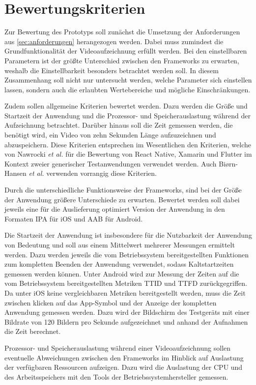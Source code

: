 \section{Bewertungskriterien}

Zur Bewertung des Prototyps soll zunächst die Umsetzung der Anforderungen aus \autoref{sec:anforderungen} herangezogen werden.
Dabei muss zumindest die Grundfunktionalität der Videoaufzeichnung erfüllt werden.
Bei den einstellbaren Parametern ist der größte Unterschied zwischen den Frameworks zu erwarten, weshalb die Einstellbarkeit besonders betrachtet werden soll.
In diesem Zusammenhang soll nicht nur untersucht werden, welche Parameter sich einstellen lassen, sondern auch die erlaubten Wertebereiche und mögliche Einschränkungen.


Zudem sollen allgemeine Kriterien bewertet werden.
Dazu werden die Größe und Startzeit der Anwendung und die Prozessor- und Speicherauslastung während der Aufzeichnung betrachtet.
Darüber hinaus soll die Zeit gemessen werden, die benötigt wird, ein Video von zehn Sekunden Länge aufzuzeichnen und abzuspeichern.
Diese Kriterien entsprechen im Wesentlichen den Kriterien, welche von Nawrocki \textit{et al.} \cite{Nawrocki_Comparison_Hybrid_Native_Frameworks} für die Bewertung von React Native, Xamarin und Flutter im Kontext zweier generischer Testanwendungen verwendet werden.
Auch Bi{\o}rn-Hansen \textit{et al.} \cite{Biorn-Hansen_PerformanceOverhead_CrossPlatform} verwenden vorrangig diese Kriterien.

Durch die unterschiedliche Funktionsweise der Frameworks, sind bei der Größe der Anwendung größere Unterschiede zu erwarten.
Bewertet werden soll dabei jeweils eine für die Auslieferung optimiert Version der Anwendung in den Formaten \ac{IPA} für iOS und \ac{AAB} für Android.

Die Startzeit der Anwendung ist insbesondere für die Nutzbarkeit der Anwendung von Bedeutung und soll aus einem Mittelwert mehrerer Messungen ermittelt werden.
Dazu werden jeweils die vom Betriebssystem bereitgestellten Funktionen zum kompletten Beenden der Anwendung verwendet, sodass Kaltstartzeiten gemessen werden können.
Unter Android wird zur Messung der Zeiten auf die vom Betriebssystem bereitgestellten Metriken \ac{TTID} und \ac{TTFD} zurückgegriffen.
Da unter iOS keine vergleichbaren Metriken bereitgestellt werden, muss die Zeit zwischen klicken auf das App-Symbol und der Anzeige der kompletten Anwendung gemessen werden.
Dazu wird der Bildschirm des Testgeräts mit einer Bildrate von 120 Bildern pro Sekunde aufgezeichnet und anhand der Aufnahmen die Zeit berechnet.

Prozessor- und Speicherauslastung während einer Videoaufzeichnung sollen eventuelle Abweichungen zwischen den Frameworks im Hinblick auf Auslastung der verfügbaren Ressourcen aufzeigen.
Dazu wird die Auslastung der CPU und des Arbeitsspeichers mit den Tools der Betriebssystemhersteller gemessen.
